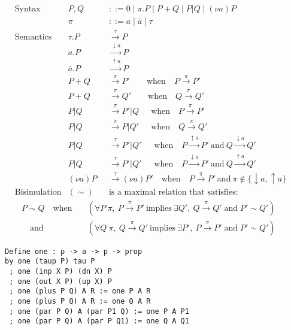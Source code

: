 \documentclass{llncs}
\begin{document}
\begin{figure}
\begin{align*}
&\text{Syntax} &
P,Q &::= 0 \mid \pi.P \mid P + Q \mid P|Q \mid (\nu a)P \\ &&
\pi &::= a \mid \bar{a} \mid \tau
\\
&\text{Semantics} &
\tau.P &\xrightarrow{\tau} P \\ &&
a.P &\xrightarrow{\downarrow a} P \\ &&
\bar{a}.P &\xrightarrow{\uparrow a} P \\ &&
P+Q &\xrightarrow{\pi} P' \qquad\text{when}\quad P \xrightarrow{\pi} P' \\ &&
P+Q &\xrightarrow{\pi} Q' \qquad\text{when}\quad Q \xrightarrow{\pi} Q' \\ &&
P|Q &\xrightarrow{\pi} P'|Q ~~\quad\text{when}\quad P \xrightarrow{\pi} P' \\ &&
P|Q &\xrightarrow{\pi} P|Q' ~~\quad\text{when}\quad Q \xrightarrow{\pi} Q' \\ &&
P|Q &\xrightarrow{\tau} P'|Q' ~\;\quad\text{when}\quad
  P \xrightarrow{\uparrow a} P' ~\text{and}~
  Q \xrightarrow{\downarrow a} Q' \\ &&
P|Q &\xrightarrow{\tau} P'|Q' ~\;\quad\text{when}\quad
  P \xrightarrow{\downarrow a} P' ~\text{and}~
  Q \xrightarrow{\uparrow a} Q' \\ &&
(\nu a)P &\xrightarrow{\tau} (\nu a)P' \quad\text{when}\quad
  P \xrightarrow{\pi} P' ~\text{and}~ \pi \notin \{\downarrow a, \uparrow a\}
  \\[2ex]
  &\text{Bisimulation} & (\sim)\quad &
  \text{is a maximal relation that satisfies:}
\end{align*}
\vspace{-6ex}
\begin{align*}
  &&P \sim Q \quad\text{when}\quad
&(\forall P ~ \pi,~ P\xrightarrow{\pi}P' ~\text{implies}~
        \exists Q',~ Q\xrightarrow{\pi}Q' \;\text{and}\; P'\sim Q') \\ &&
      \quad\text{and}~
&(\forall Q ~ \pi,~ Q\xrightarrow{\pi}Q' ~\text{implies}~
        \exists P',~ P\xrightarrow{\pi}P' \;\text{and}\; P'\sim Q')
\end{align*}
\vspace*{-3ex}
\begin{verbatim}
Define one : p -> a -> p -> prop
by one (taup P) tau P
 ; one (inp X P) (dn X) P
 ; one (out X P) (up X) P
 ; one (plus P Q) A R := one P A R
 ; one (plus P Q) A R := one Q A R
 ; one (par P Q) A (par P1 Q) := one P A P1
 ; one (par P Q) A (par P Q1) := one Q A Q1

\end{verbatim}
\end{figure}
\end{document}

